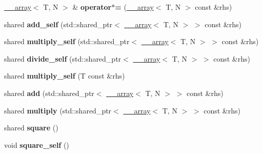 \begin{DoxyCompactItemize}
\item 
\hypertarget{class____array_a5b698b219ec8e62bab83528564caa579}{\hyperlink{class____array}{\-\_\-\-\_\-array}$<$ T, N $>$ \& {\bfseries operator$\ast$=} (\hyperlink{class____array}{\-\_\-\-\_\-array}$<$ T, N $>$ const \&rhs)}\label{class____array_a5b698b219ec8e62bab83528564caa579}

\item 
\hypertarget{class____array_ab98796270b9e65a78d5d9eda70c66ef9}{shared {\bfseries add\-\_\-self} (std\-::shared\-\_\-ptr$<$ \hyperlink{class____array}{\-\_\-\-\_\-array}$<$ T, N $>$ $>$ const \&rhs)}\label{class____array_ab98796270b9e65a78d5d9eda70c66ef9}

\item 
\hypertarget{class____array_a34920f8760f31932fa0b7134ad852fe3}{shared {\bfseries multiply\-\_\-self} (std\-::shared\-\_\-ptr$<$ \hyperlink{class____array}{\-\_\-\-\_\-array}$<$ T, N $>$ $>$ const \&rhs)}\label{class____array_a34920f8760f31932fa0b7134ad852fe3}

\item 
\hypertarget{class____array_a99892174a079f472bcd3f95621e5b18e}{shared {\bfseries divide\-\_\-self} (std\-::shared\-\_\-ptr$<$ \hyperlink{class____array}{\-\_\-\-\_\-array}$<$ T, N $>$ $>$ const \&rhs)}\label{class____array_a99892174a079f472bcd3f95621e5b18e}

\item 
\hypertarget{class____array_a87ee1d56dc650d1cc15fc4a17e29a2ff}{shared {\bfseries multiply\-\_\-self} (T const \&rhs)}\label{class____array_a87ee1d56dc650d1cc15fc4a17e29a2ff}

\item 
\hypertarget{class____array_ab20b7f53c81ac31b349d31bc58e650f6}{shared {\bfseries add} (std\-::shared\-\_\-ptr$<$ \hyperlink{class____array}{\-\_\-\-\_\-array}$<$ T, N $>$ $>$ const \&rhs)}\label{class____array_ab20b7f53c81ac31b349d31bc58e650f6}

\item 
\hypertarget{class____array_a35d7cfec43ce9f395f148b64a6083a69}{shared {\bfseries multiply} (std\-::shared\-\_\-ptr$<$ \hyperlink{class____array}{\-\_\-\-\_\-array}$<$ T, N $>$ $>$ const \&rhs)}\label{class____array_a35d7cfec43ce9f395f148b64a6083a69}

\item 
\hypertarget{class____array_a566abb01d09bf563edf9f7f761b4317d}{shared {\bfseries square} ()}\label{class____array_a566abb01d09bf563edf9f7f761b4317d}

\item 
\hypertarget{class____array_ad6e7fc66551df684d4337929b8636446}{void {\bfseries square\-\_\-self} ()}\label{class____array_ad6e7fc66551df684d4337929b8636446}


\end{DoxyCompactItemize}
